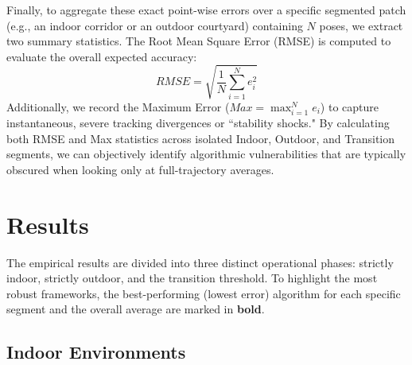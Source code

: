\documentclass[pdflatex,sn-mathphys-num]{sn-jnl}
\theoremstyle{thmstyleone}%
\theoremstyle{thmstyletwo}%
\theoremstyle{thmstylethree}%
\begin{document}
Finally, to aggregate these exact point-wise errors over a specific segmented patch (e.g., an indoor corridor or an outdoor courtyard) containing $N$ poses, we extract two summary statistics. The Root Mean Square Error (RMSE) is computed to evaluate the overall expected accuracy:
\begin{equation}
    RMSE = \sqrt{\frac{1}{N} \sum_{i=1}^{N} e_i^2}
\end{equation}
Additionally, we record the Maximum Error ($Max = \max_{i=1}^{N} e_i$) to capture instantaneous, severe tracking divergences or ``stability shocks." By calculating both RMSE and Max statistics across isolated Indoor, Outdoor, and Transition segments, we can objectively identify algorithmic vulnerabilities that are typically obscured when looking only at full-trajectory averages.

\section{Results}
The empirical results are divided into three distinct operational phases: strictly indoor, strictly outdoor, and the transition threshold. To highlight the most robust frameworks, the best-performing (lowest error) algorithm for each specific segment and the overall average are marked in \textbf{bold}.

\subsection{Indoor Environments}
\end{document}
